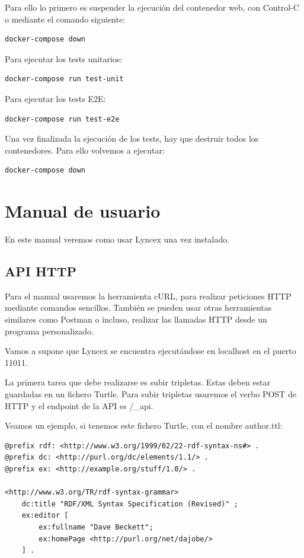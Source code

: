 \documentclass[12pt]{report} %
\begin{document}
Para ello lo primero es suspender la ejecución del contenedor web, con Control-C o mediante el comando siguiente:
\begin{verbatim}
docker-compose down
\end{verbatim}

Para ejecutar los tests unitarios:
\begin{verbatim}
docker-compose run test-unit
\end{verbatim}

Para ejecutar los tests E2E:
\begin{verbatim}
docker-compose run test-e2e
\end{verbatim}

Una vez finalizada la ejecución de los tests, hay que destruir todos los contenedores. Para ello volvemos a ejecutar:
\begin{verbatim}
docker-compose down
\end{verbatim}

\section{Manual de usuario}

En este manual veremos como usar Lyncex una vez instalado. 

\subsection{API HTTP}
Para el manual usaremos la herramienta cURL, para realizar peticiones HTTP mediante comandos sencillos. También se pueden usar otras herramientas similares como Postman o incluso, realizar las llamadas HTTP desde un programa personalizado.

Vamos a supone que Lyncex se encuentra ejecutándose en localhost en el puerto 11011.

La primera tarea que debe realizarse es subir tripletas. Estas deben estar guardadas en un fichero Turtle. Para subir tripletas usaremos el verbo POST de HTTP y el endpoint de la API es /\_api.

Veamos un ejemplo, si tenemos este fichero Turtle, con el nombre author.ttl:

\begin{lstlisting}
@prefix rdf: <http://www.w3.org/1999/02/22-rdf-syntax-ns#> .
@prefix dc: <http://purl.org/dc/elements/1.1/> .
@prefix ex: <http://example.org/stuff/1.0/> .

<http://www.w3.org/TR/rdf-syntax-grammar>
    dc:title "RDF/XML Syntax Specification (Revised)" ;
    ex:editor [
        ex:fullname "Dave Beckett";
        ex:homePage <http://purl.org/net/dajobe/>
    ] .
\end{lstlisting}
\end{document}
